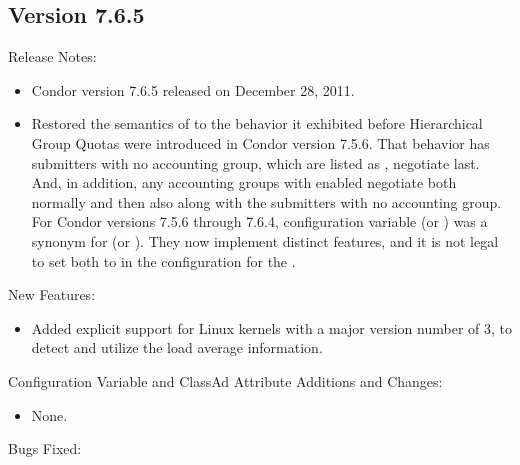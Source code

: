 \subsection*{\label{sec:New-7-6-5}Version 7.6.5}

\noindent Release Notes:

\begin{itemize}

\item Condor version 7.6.5 released on December 28, 2011.

\item Restored the semantics of  to the
behavior it exhibited before Hierarchical Group Quotas were introduced
in Condor version 7.5.6.
That behavior has submitters with no accounting group,
which are listed as , negotiate last.
And, in addition, any accounting groups with 
enabled negotiate both normally and then also along with the 
submitters with no accounting group.
For Condor versions 7.5.6 through 7.6.4, configuration variable
 (or )
was a synonym for 
(or ).
They now implement distinct features,
and it is not legal to set both to  in the configuration
for the .

\end{itemize}


\noindent New Features:

\begin{itemize}

\item Added explicit support for Linux kernels with a major version number of 3,
to detect and utilize the load average information.

\end{itemize}

\noindent Configuration Variable and ClassAd Attribute Additions and Changes:

\begin{itemize}

\item None.

\end{itemize}

\noindent Bugs Fixed:

